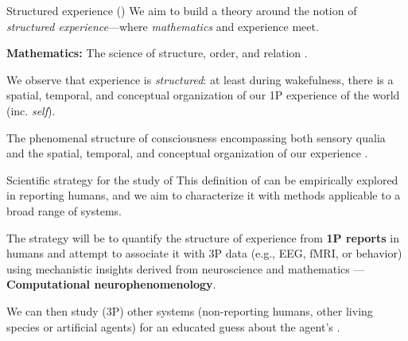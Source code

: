 \begin{frame}[label=intro2]{Structured experience (\SEP)}
 We aim to build a theory around the notion of 
{\em structured experience}---where {\em mathematics} and experience meet.  \vfill

{\bf Mathematics:}  The science of structure, order, and relation  \cite{gray_2010}.  \vfill

We observe that  experience is {\em structured}: at least during wakefulness, there is a spatial, temporal, and conceptual organization of our 1P experience of the world (inc. {\em self}). \vfill

	\begin{definition}
The phenomenal structure of consciousness  encompassing both sensory qualia and the spatial, temporal, and conceptual organization of our experience  \citep{VanGulick:2016aa}. 
	\end{definition}

	

\end{frame}

\begin{frame}[label=intro3]{Scientific strategy for the study of \SEP}
This definition of \SEP can be empirically explored in reporting humans, and  we   aim to characterize it with methods  applicable to a broad range of systems.  \vfill

  The strategy will be to quantify the structure of experience from {\bf 1P reports}  in humans and attempt to associate it with 3P data (e.g., EEG, fMRI, or behavior) using mechanistic insights derived from neuroscience and mathematics --- \textbf{Computational neurophenomenology}.  \vfill
  
  We can then study (3P) other systems (non-reporting humans, other living species or artificial agents) %
  for an educated guess about the agent's \SEP.

\end{frame}

